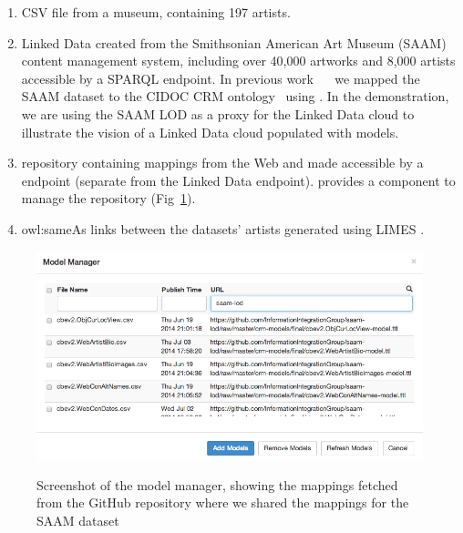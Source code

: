 \begin{enumerate}
\item CSV file from a museum, containing 197 artists. %
\item Linked Data created from the Smithsonian American Art Museum (SAAM) content management system, including over 40,000 artworks and 8,000 artists accessible by a SPARQL endpoint. 
In previous work~\cite{Szekely:2013vq} ~ we mapped the SAAM dataset to the CIDOC CRM ontology~\cite{Doerr:2003:CCR:958671.958678} using \rtworml.
In the demonstration, we are using the SAAM LOD as a proxy for the Linked Data cloud to illustrate the vision of a Linked Data cloud populated with \rtworml models.
\item \rtworml repository containing \rtworml mappings from the Web and made accessible by a \sparql endpoint (separate from the Linked Data endpoint).
\karma provides a component to manage the \rtworml repository (Fig~\ref{fig:model-manager-screenshot}).
\item owl:sameAs links between the datasets' artists generated using LIMES \cite{ngomo2011limes}.
\end{enumerate}
\begin{figure}[bth]
\begin{center}
\includegraphics[width=4.8in]{images/3-model-manager.png}
\vspace{-3mm}
\caption{Screenshot of the model manager, showing the \rtworml mappings fetched from the GitHub repository where we shared the mappings for the SAAM dataset}
\vspace{-2mm}
\label{fig:model-manager-screenshot}
\end{center}
\vspace{-1.5em}
\end{figure}